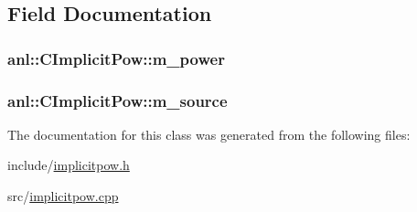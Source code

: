 \subsection{Field Documentation}
\hypertarget{classanl_1_1CImplicitPow_a583a37c58658b696b7352bb111429de5}{
\subsubsection[{m\_\-power}]{ {\bf anl::CImplicitPow::m\_\-power}}}
\label{classanl_1_1CImplicitPow_a583a37c58658b696b7352bb111429de5}
\hypertarget{classanl_1_1CImplicitPow_aae11a9a743adf6158fe9190f2f358538}{
\subsubsection[{m\_\-source}]{ {\bf anl::CImplicitPow::m\_\-source}}}
\label{classanl_1_1CImplicitPow_aae11a9a743adf6158fe9190f2f358538}


The documentation for this class was generated from the following files:\begin{DoxyCompactItemize}
\item 
include/\hyperlink{implicitpow_8h}{implicitpow.h}\item 
src/\hyperlink{implicitpow_8cpp}{implicitpow.cpp}\end{DoxyCompactItemize}
